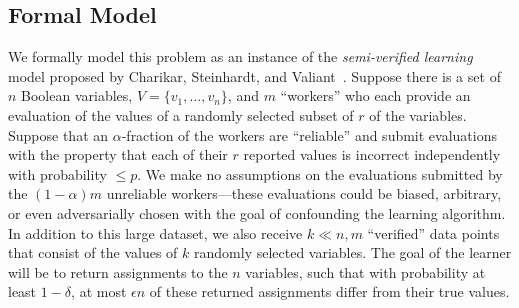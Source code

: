 \documentclass[final,12pt]{colt2018}
\newcommand{\eps}{\epsilon}
\begin{document}
\begin{comment}
The above setting, where one has a large dataset reflecting a number of demographics, and wishes to leverage the large dataset in conjunction with a very small set of ``verified'' datapoints from one demographic of interest, seems widely applicable beyond the market research domain.  Indeed, there are many biological or health-related datasets where the ``demographic of interest'' might be a trait that is expensive to evaluate.  For example, perhaps one has a large database of medical records, and wishes to investigate the propensity of certain medical conditions for the subset of people with a specific genetic mutation.  The large dataset of medical records will likely not contain information about whether individuals have the mutation in question.  Nevertheless, our results imply that accurate inferences about this subset of people can likely be made as long as 1) the fraction of people with the mutation in the large dataset is not minuscule, and 2) one can obtain a small (i.e. constant) amount of data from individuals with the genetic mutation in question, for example studying a constant number of individuals who are known to have the mutation.
\end{comment}

\subsection{Formal Model}

We formally model this problem as an instance of the \emph{semi-verified learning} model proposed by Charikar, Steinhardt, and Valiant~\citep{CSV17}.   Suppose there is a set of $n$ Boolean variables, $V = \{v_1,\ldots,v_n\}$, and $m$ ``workers'' who each provide an evaluation of the values of a randomly selected subset of $r$ of the variables.  Suppose that an $\alpha$-fraction of the workers are ``reliable'' and submit evaluations with the property that each of their $r$ reported values is incorrect independently with probability $\le p$.  We make no assumptions on the evaluations submitted by the $(1-\alpha)m$ unreliable workers---these evaluations could be biased, arbitrary, or even adversarially chosen with the goal of confounding the learning algorithm.   In addition to this large dataset, we also receive $k \ll n,m$ ``verified'' data points that consist of the values of $k$ randomly selected variables.  The goal of the learner will be to return assignments to the $n$ variables, such that with probability at least $1-\delta$, at most $\eps n$ of these returned assignments differ from their true values.
\end{document}
